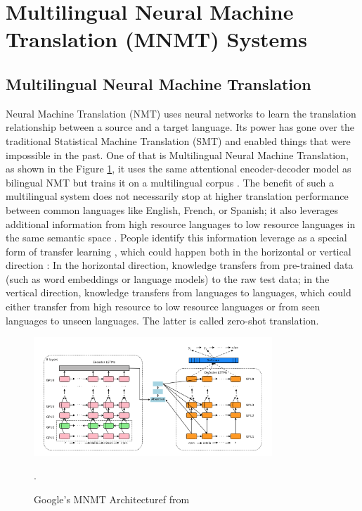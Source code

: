 \documentclass[thesis,fonts=libertine]{cluu}
\begin{document}
\section{Multilingual Neural Machine Translation (MNMT) Systems}

\subsection{Multilingual Neural Machine Translation}

Neural Machine Translation (NMT) uses neural networks to learn the translation relationship between a source and a target language. Its power has gone over the traditional Statistical Machine Translation (SMT) and enabled things that were impossible in the past. One of that is Multilingual Neural Machine Translation, as shown in the Figure \ref{fig:google_mnmt}, it uses the same attentional encoder-decoder model as bilingual NMT but trains it on a multilingual corpus \parencite{Johnson:2016aa}. The benefit of such a multilingual system does not necessarily stop at higher translation performance between common languages like English, French, or Spanish; it also leverages additional information from high resource languages to low resource languages in the same semantic space \parencite{Ha:2016aa}. People identify this information leverage as a special form of transfer learning \parencite{Zoph:2016aa}, which could happen both in the horizontal or vertical direction \parencite{Lakew:2019aa}: In the horizontal direction, knowledge transfers from pre-trained data (such as word embeddings or language models) to the raw test data; in the vertical direction, knowledge transfers from languages to languages, which could either transfer from high resource to low resource languages or from seen languages to unseen languages. The latter is called zero-shot translation.

\begin{figure}
  \centering
  \includegraphics[width=0.8\textwidth]{google_mnmt_architecture.png}
  \caption{Google's MNMT Architecturef from \parencite{Johnson:2016aa}}.
  \label{fig:google_mnmt}
\end{figure}
\end{document}
